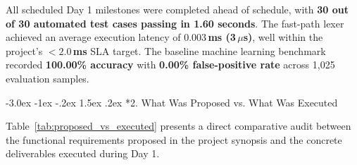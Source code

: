 \documentclass[11pt,a4paper]{article}
\makeatletter
\renewcommand{\section}{\@startsection{section}{1}{\z@}%
  {-3.0ex \@plus -1ex \@minus -.2ex}%
  {1.5ex \@plus .2ex}%
  {\normalfont\large\bfseries\color{primaryblue}}}
\makeatother
\begin{document}
All scheduled Day 1 milestones were completed ahead of schedule, with \textbf{30 out of 30 automated test cases passing in 1.60 seconds}. The fast-path lexer achieved an average execution latency of \textbf{$0.003$\,ms (3\,$\mu$s)}, well within the project's $\mathbf{< 2.0}$\,\textbf{ms} SLA target. The baseline machine learning benchmark recorded \textbf{100.00\% accuracy} with \textbf{0.00\% false-positive rate} across 1,025 evaluation samples.

\section*{2. What Was Proposed vs. What Was Executed}

Table~\ref{tab:proposed_vs_executed} presents a direct comparative audit between the functional requirements proposed in the project synopsis and the concrete deliverables executed during Day 1.
\end{document}

